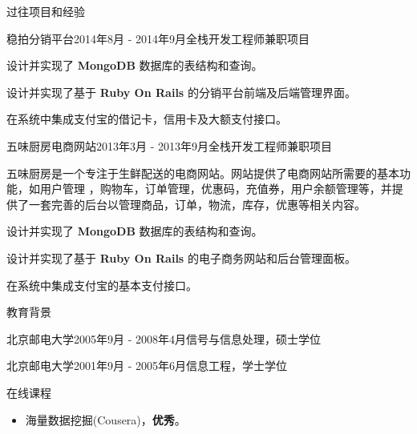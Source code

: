 \documentclass{resume} %
\newcommand{\kaiti}{\CJKfamily{kaiti}}
\begin{document}
\begin{rSection}{\kaiti 过往项目和经验}
\begin{rSubsection}{稳拍分销平台}{2014年8月 - 2014年9月}{全栈开发工程师}{兼职项目}
\begin{rSubsectionList}
\item 设计并实现了 \textbf{MongoDB} 数据库的表结构和查询。
\item 设计并实现了基于 \textbf{Ruby On Rails} 的分销平台前端及后端管理界面。
\item 在系统中集成支付宝的借记卡，信用卡及大额支付接口。
\end{rSubsectionList}
\end{rSubsection}



\begin{rSubsection}{五味厨房电商网站}{2013年3月 - 2013年9月}{全栈开发工程师}{兼职项目}

五味厨房是一个专注于生鲜配送的电商网站。网站提供了电商网站所需要的基本功能，如用户管理 ，购物车，订单管理，优惠码，充值券，用户余额管理等，并提供了一套完善的后台以管理商品，订单，物流，库存，优惠等相关内容。

\begin{rSubsectionList}
\item 设计并实现了 \textbf{MongoDB} 数据库的表结构和查询。
\item 设计并实现了基于 \textbf{Ruby On Rails} 的电子商务网站和后台管理面板。
\item 在系统中集成支付宝的基本支付接口。
\end{rSubsectionList}
\end{rSubsection}

\end{rSection}

\begin{rSection}{\kaiti 教育背景}
\begin{rSubsection}{北京邮电大学}{2005年9月 - 2008年4月}{信号与信息处理，硕士学位}{}
\end{rSubsection}

\begin{rSubsection}{北京邮电大学}{2001年9月 - 2005年6月}{信息工程，学士学位}{}
\end{rSubsection}

\begin{rSubsection}{在线课程}{}{}{}
  \begin{itemize}
    \item 海量数据挖掘(Cousera)，\textbf{优秀}。
  \end{itemize}
\end{rSubsection}

\end{rSection}
\end{document}
